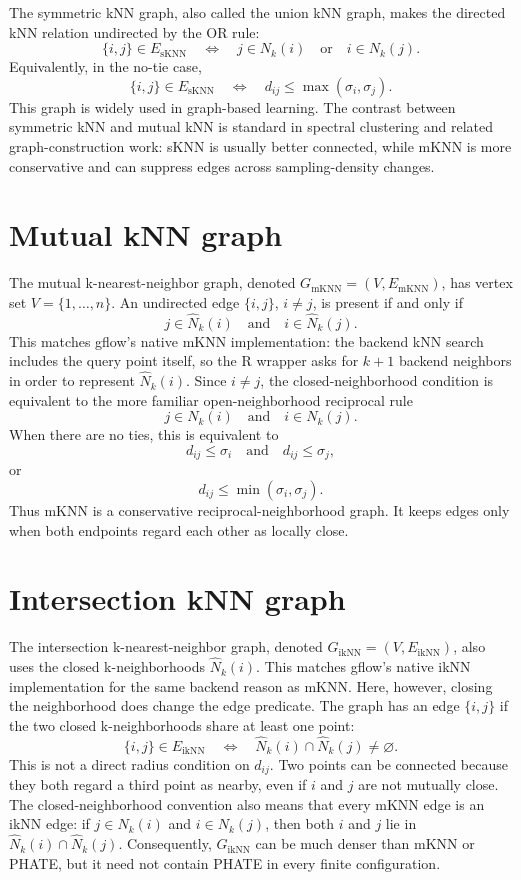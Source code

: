 \documentclass[11pt]{article}
\begin{document}
The symmetric kNN graph, also called the union kNN graph, makes the directed kNN relation
undirected by the OR rule:
\[
  \{i,j\}\in E_{\mathrm{sKNN}}
  \quad\Longleftrightarrow\quad
  j\in N_k(i)\quad\text{or}\quad i\in N_k(j).
\]
Equivalently, in the no-tie case,
\[
  \{i,j\}\in E_{\mathrm{sKNN}}
  \quad\Longleftrightarrow\quad
  d_{ij}\le \max(\sigma_i,\sigma_j).
\]
This graph is widely used in graph-based learning.  The contrast between symmetric kNN and
mutual kNN is standard in spectral clustering and related graph-construction work: sKNN is
usually better connected, while mKNN is more conservative and can suppress edges across
sampling-density changes.

\section{Mutual kNN graph}

The mutual k-nearest-neighbor graph, denoted \(G_{\mathrm{mKNN}}=(V,E_{\mathrm{mKNN}})\),
has vertex set \(V=\{1,\ldots,n\}\).  An undirected edge \(\{i,j\}\), \(i\ne j\), is present
if and only if
\[
  j\in \widehat{N}_k(i)
  \quad\text{and}\quad
  i\in \widehat{N}_k(j).
\]
This matches gflow's native mKNN implementation: the backend kNN search includes the query
point itself, so the R wrapper asks for \(k+1\) backend neighbors in order to represent
\(\widehat{N}_k(i)\).  Since \(i\ne j\), the closed-neighborhood condition is equivalent to
the more familiar open-neighborhood reciprocal rule
\[
  j\in N_k(i)
  \quad\text{and}\quad
  i\in N_k(j).
\]
When there are no ties, this is equivalent to
\[
  d_{ij}\le \sigma_i
  \quad\text{and}\quad
  d_{ij}\le \sigma_j,
\]
or
\[
  d_{ij}\le \min(\sigma_i,\sigma_j).
\]
Thus mKNN is a conservative reciprocal-neighborhood graph.  It keeps edges only when both
endpoints regard each other as locally close.

\section{Intersection kNN graph}

The intersection k-nearest-neighbor graph, denoted \(G_{\mathrm{ikNN}}=(V,E_{\mathrm{ikNN}})\),
also uses the closed k-neighborhoods \(\widehat{N}_k(i)\).  This matches gflow's native ikNN
implementation for the same backend reason as mKNN.  Here, however, closing the neighborhood
does change the edge predicate.  The graph has an edge \(\{i,j\}\) if the two closed
k-neighborhoods share at least one point:
\[
  \{i,j\}\in E_{\mathrm{ikNN}}
  \quad\Longleftrightarrow\quad
  \widehat{N}_k(i)\cap \widehat{N}_k(j)\ne \varnothing.
\]
This is not a direct radius condition on \(d_{ij}\).  Two points can be connected because
they both regard a third point as nearby, even if \(i\) and \(j\) are not mutually close.
The closed-neighborhood convention also means that every mKNN edge is an ikNN edge: if
\(j\in N_k(i)\) and \(i\in N_k(j)\), then both \(i\) and \(j\) lie in
\(\widehat{N}_k(i)\cap\widehat{N}_k(j)\).  Consequently, \(G_{\mathrm{ikNN}}\) can be much
denser than mKNN or PHATE, but it need not contain PHATE in every finite configuration.
\end{document}
